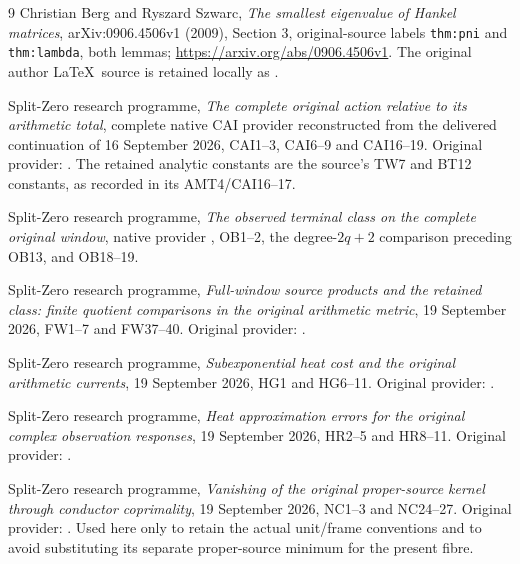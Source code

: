 \documentclass[11pt]{article}
\begin{document}
\begin{thebibliography}{9}
Christian Berg and Ryszard Szwarc,
\emph{The smallest eigenvalue of Hankel matrices},
arXiv:0906.4506v1 (2009), Section 3, original-source labels
\texttt{thm:pni} and \texttt{thm:lambda}, both lemmas;
\url{https://arxiv.org/abs/0906.4506v1}.
The original author \LaTeX\ source is retained locally as
.

Split-Zero research programme,
\emph{The complete original action relative to its arithmetic total},
complete native CAI provider reconstructed from the delivered continuation
of 16 September 2026, CAI1--3, CAI6--9 and CAI16--19.
Original provider: .
The retained analytic constants are the source's TW7 and BT12 constants,
as recorded in its AMT4/CAI16--17.

Split-Zero research programme,
\emph{The observed terminal class on the complete original window},
native provider , OB1--2,
the degree-$2q+2$ comparison preceding OB13, and OB18--19.

Split-Zero research programme,
\emph{Full-window source products and the retained class:
finite quotient comparisons in the original arithmetic metric},
19 September 2026, FW1--7 and FW37--40.
Original provider: .

Split-Zero research programme,
\emph{Subexponential heat cost and the original arithmetic currents},
19 September 2026, HG1 and HG6--11.
Original provider: .

Split-Zero research programme,
\emph{Heat approximation errors for the original complex observation responses},
19 September 2026, HR2--5 and HR8--11.
Original provider: .

Split-Zero research programme,
\emph{Vanishing of the original proper-source kernel through conductor coprimality},
19 September 2026, NC1--3 and NC24--27.
Original provider: .
Used here only to retain the actual unit/frame conventions and to avoid
substituting its separate proper-source minimum for the present fibre.
\end{thebibliography}
\end{document}
